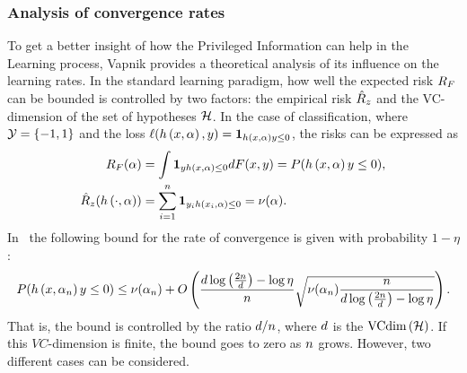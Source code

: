 \subsubsection*{Analysis of convergence rates}
To get a better insight of how the Privileged Information can help in the Learning process, Vapnik provides a theoretical analysis of its influence on the learning rates.
In the standard learning paradigm, how well the expected risk $R_F$ can be bounded is controlled by two factors: the empirical risk $\hat{R}_z$ and the VC-dimension of the set of hypotheses $\mathcal{\mathcal{H}}$.
In the case of classification, where $\mathcal{Y} = \left\{-1, 1\right\}$ and the loss $\ell(h\left(x, \alpha\right), y) = \bm{1}_{h\left(x, \alpha\right) y \leq 0}$, the risks can be expressed as
\begin{align*}
    \nonumber
    R_F (\alpha) &= \int \bm{1}_{y h\left(x, \alpha\right) \leq 0} dF(x, y) =  P(h\left(x, \alpha\right) y \leq 0) ,\\
    \hat{R}_z(h\left(\cdot, \alpha\right)) &= \sum_{i=1}^n \bm{1}_{y_i h\left(x_i, \alpha\right) \leq 0} = \nu(\alpha) .
\end{align*}
In~\cite[Theorem~6.8]{vapnik1982estimation} the following bound for the rate of convergence is given with probability $1 - \eta$:
\begin{equation}
    \nonumber
    P(h\left(x, \alpha_n\right) y \leq 0) \leq \nu(\alpha_n) + O\left( \frac{d \log\left(\frac{2n}{d} \right) - \log\eta}{n} \sqrt{\nu(\alpha_n) \frac{n}{d \log\left(\frac{2n}{d} \right) - \log\eta}}  \right) .
\end{equation}
That is, the bound is controlled by the ratio $d/n$, where $d$ is the $\text{VCdim}\left(\mathcal{H}\right)$. If this $VC$-dimension is finite, the bound goes to zero as $n$ grows.
However, two different cases can be considered.
\\

